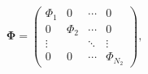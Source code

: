 \begin{equation}
\mathbf{\Phi} = 
\left( 
\begin{array}{cccc}  
\Phi_1 & 0      &  \cdots & 0  \\
0      & \Phi_2 &  \cdots & 0  \\ 
\vdots &        & \ddots  & \vdots   \\
0      & 0      & \cdots  & \Phi_{N_2}  
\end{array}
\right),
\end{equation}

